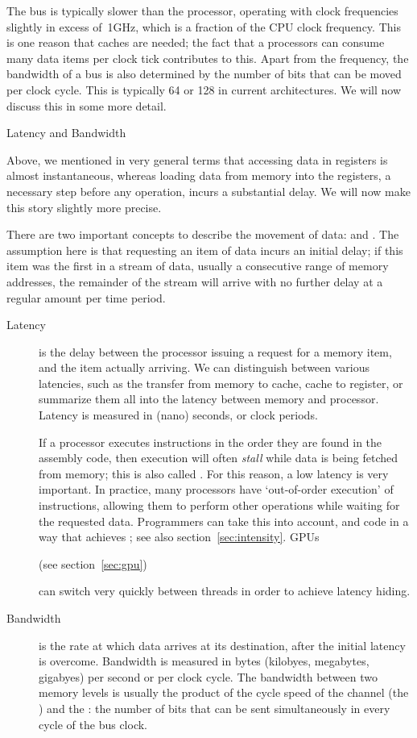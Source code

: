 The bus is typically slower than the processor, operating with clock
frequencies slightly in excess of~1GHz, which is a fraction of the CPU
clock frequency.  This is one reason that caches are needed; the fact
that a processors can consume many data items per clock tick
contributes to this. Apart from the frequency, the bandwidth of a bus is
also determined by the number of bits that can be moved per clock
cycle. This is typically 64 or 128 in current architectures. We will
now discuss this in some more detail.

 {Latency and Bandwidth}
\label{sec:latencybandwidth}

Above, we mentioned in very general terms that accessing data in
registers is almost instantaneous, whereas loading data from memory
into the registers, a necessary step before any operation, incurs a
substantial delay. We will now make this story slightly more precise.

There are two important concepts to describe the movement of data:
 and . The assumption here is
that requesting an item of data incurs an initial delay; if this item
was the first in a stream of data, usually a consecutive range of
memory addresses, the remainder of the stream will arrive with no
further delay
at a regular amount per time period.
\begin{description}
\item[Latency] is the delay between the processor issuing a request
  for a memory item, and the item actually arriving. We can
  distinguish between various latencies, such as the transfer from
  memory to cache, cache to register, or summarize them all into the
  latency between memory and processor. Latency is measured in (nano)
  seconds, or clock periods.

  If a processor executes instructions in the order they are found in
  the assembly code, then execution will often \emph{stall} while
  data is being fetched from memory; this is also called
  . For this reason, a low latency is very
  important. In practice, many processors have `out-of-order
  execution' of instructions, allowing them to perform other
  operations while waiting for the requested data. Programmers can
  take this into account, and code in a way that achieves
  ; see also section~\ref{sec:intensity}.
  \acp{GPU} 
\begin{gpu}
  (see section~\ref{sec:gpu})  
\end{gpu}
  can switch very quickly between threads in order to achieve latency hiding.
\item[Bandwidth] is the rate at which data arrives at its destination,
  after the initial latency is overcome. Bandwidth is measured in
  bytes (kilobyes, megabytes, gigabyes) per second or per clock cycle.
  The bandwidth between two memory levels is usually the product of
  the cycle speed of the channel (the ) and
  the : the number of bits that can be sent
  simultaneously in every cycle of the bus clock.
\end{description}

